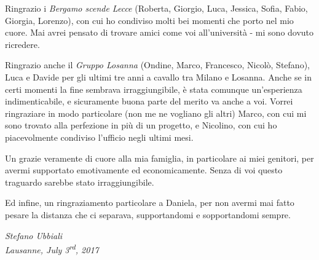 \documentclass[12pt, a4paper, twoside, openright, notitlepage]{report}
\numberwithin{equation}{chapter}
\theoremstyle{theorem}
\theoremstyle{definition}
\theoremstyle{remark}
\theoremstyle{proposition}
\numberwithin{figure}{chapter}
\begin{document}
		Ringrazio i \emph{Bergamo scende Lecce} (Roberta, Giorgio, Luca, Jessica, Sofia, Fabio, Giorgia, Lorenzo), con cui ho condiviso molti bei momenti che porto nel mio cuore. Mai avrei pensato di trovare amici come voi all'università - mi sono dovuto ricredere.
		
		Ringrazio anche il \emph{Gruppo Losanna} (Ondine, Marco, Francesco, Nicolò, Stefano), Luca e Davide per gli ultimi tre anni a cavallo tra Milano e Losanna. Anche se in certi momenti la fine sembrava irraggiungibile, è stata comunque un'esperienza indimenticabile, e sicuramente buona parte del merito va anche a voi. Vorrei ringraziare in modo particolare (non me ne vogliano gli altri) Marco, con cui mi sono trovato alla perfezione in più di un progetto, e Nicolino, con cui ho piacevolmente condiviso l'ufficio negli ultimi mesi.
		
		Un grazie veramente di cuore alla mia famiglia, in particolare ai miei genitori, per avermi supportato emotivamente ed economicamente. Senza di voi questo traguardo sarebbe stato irraggiungibile.
		
		Ed infine, un ringraziamento particolare a Daniela, per non avermi mai fatto pesare la distanza che ci separava, supportandomi e sopportandomi sempre. \\ 
		
		\begin{flushright}
			\emph{Stefano Ubbiali} \\
			\emph{Lausanne, July 3\textsuperscript{rd}, 2017}
		\end{flushright}
						
\end{document}
